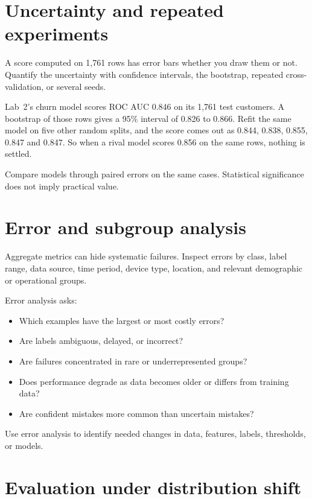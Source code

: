 \section{Uncertainty and repeated experiments}

A score computed on 1,761 rows has error bars whether you draw them or not. Quantify the uncertainty with confidence intervals, the bootstrap, repeated cross-validation, or several seeds.

\begin{workedexample}
Lab~2's churn model scores ROC AUC 0.846 on its 1,761 test customers. A bootstrap of those rows gives a 95\% interval of 0.826 to 0.866. Refit the same model on five other random splits, and the score comes out as 0.844, 0.838, 0.855, 0.847 and 0.847. So when a rival model scores 0.856 on the same rows, nothing is settled.
\end{workedexample}

Compare models through paired errors on the same cases. Statistical significance does not imply practical value.

\section{Error and subgroup analysis}

Aggregate metrics can hide systematic failures. Inspect errors by class, label range, data source, time period, device type, location, and relevant demographic or operational groups.

Error analysis asks:

\begin{itemize}
  \item Which examples have the largest or most costly errors?
  \item Are labels ambiguous, delayed, or incorrect?
  \item Are failures concentrated in rare or underrepresented groups?
  \item Does performance degrade as data becomes older or differs from training data?
  \item Are confident mistakes more common than uncertain mistakes?
\end{itemize}

Use error analysis to identify needed changes in data, features, labels, thresholds, or models.

\section{Evaluation under distribution shift}

